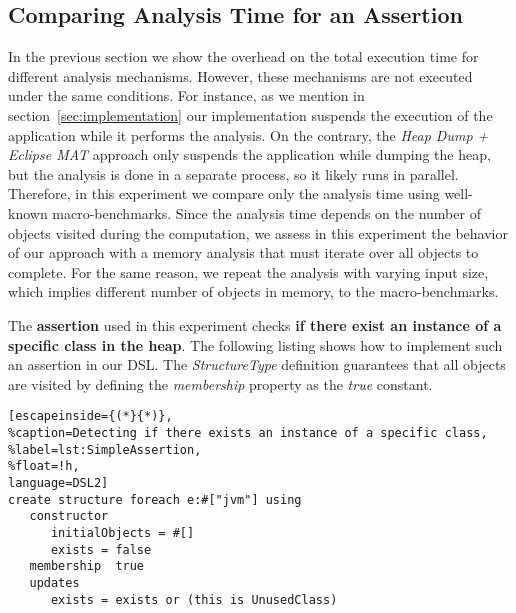 \subsection{Comparing Analysis Time for an Assertion}

In the previous section we show the overhead on the total execution time for different analysis mechanisms.
However, these mechanisms are not executed under the same conditions.
For instance, as we mention in section~\ref{sec:implementation} our implementation suspends the execution of the application while it performs the analysis.
On the contrary, the \textit{Heap Dump + Eclipse MAT} approach only suspends the application while dumping the heap, but the analysis is done in a separate process, so it likely runs in parallel.
Therefore, in this experiment we compare only the analysis time using well-known macro-benchmarks.
Since the analysis time depends on the number of objects visited during the computation, we assess in this experiment the behavior of our approach with a memory analysis that must iterate over all objects to complete.
For the same reason, we repeat the analysis with varying input size, which implies different number of objects in memory, to the macro-benchmarks.

The \textbf{assertion} used in this experiment checks \textbf{if there exist an instance of a specific class in the heap}.
The following listing shows how to implement such an assertion in our DSL.
The \textit{StructureType} definition guarantees that all objects are visited by defining the \textit{membership} property as the \textit{true} constant.
\begin{lstlisting}[escapeinside={(*}{*)},
%caption=Detecting if there exists an instance of a specific class, 
%label=lst:SimpleAssertion,
%float=!h,
language=DSL2]
create structure foreach e:#["jvm"] using
   constructor
      initialObjects = #[]
      exists = false
   membership  true
   updates
      exists = exists or (this is UnusedClass)
\end{lstlisting}

